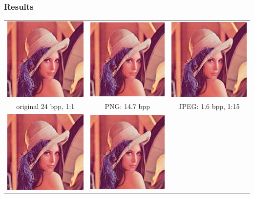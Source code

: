 \documentclass{beamer}
\begin{document}
\begin{frame}
\frametitle{Results}
\hspace*{-9mm}
\begin{tabular}{ccc}
\includegraphics[height=.31\textwidth]{lena-orig}&
\includegraphics[height=.31\textwidth]{lena-orig}&
\includegraphics[height=.31\textwidth]{lena-1600}
\\[-4pt]
\scriptsize original 24 bpp, 1:1 &\scriptsize  PNG: 14.7 bpp &\scriptsize  JPEG: 1.6 bpp, 1:15 
\\[5pt]
\includegraphics[height=.31\textwidth]{lena-0267}&
\includegraphics[height=.31\textwidth]{lena-0114}&

\end{tabular}
\end{frame}
\end{document}
